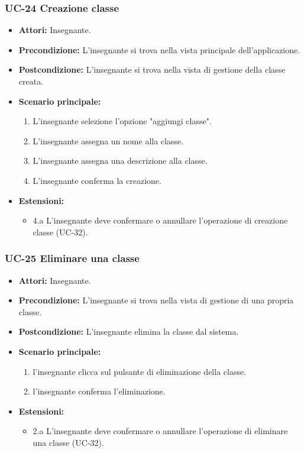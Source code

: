 \subsubsection{UC-24 Creazione classe}

\begin{itemize}
	\item \textbf{Attori:} Insegnante.
	\item \textbf{Precondizione:} L'insegnante si trova nella vista principale dell'applicazione.
	\item \textbf{Postcondizione:} L'insegnante si trova nella vista di gestione della classe creata.
	\item \textbf{Scenario principale:}
	\begin{enumerate}
		\item L'insegnante selezione l'opzione "aggiungi classe".
		\item L'insegnante assegna un nome alla classe.
		\item L'insegnante assegna una descrizione alla classe.
		\item L'insegnante conferma la creazione.
	\end{enumerate}
\item \textbf{Estensioni:}
\begin{itemize}
\item 4.a L'insegnante deve confermare o annullare l'operazione di creazione classe (UC-32).
\end{itemize}

\end{itemize}

\subsubsection{UC-25 Eliminare una classe}
\begin{itemize}
	\item \textbf{Attori:} Insegnante.
	\item \textbf{Precondizione:} L'insegnante si trova nella vista di gestione di una propria classe.
	\item \textbf{Postcondizione:} L'insegnante elimina la classe dal sistema.
	\item \textbf{Scenario principale:}
	\begin{enumerate}
		\item l'insegnante clicca sul pulsante di eliminazione della classe.
		\item l'insegnante conferma l'eliminazione.
	\end{enumerate}
\item \textbf{Estensioni:}
\begin{itemize}
	\item 2.a L'insegnante deve confermare o annullare l'operazione di eliminare una classe (UC-32).
\end{itemize}
\end{itemize}

